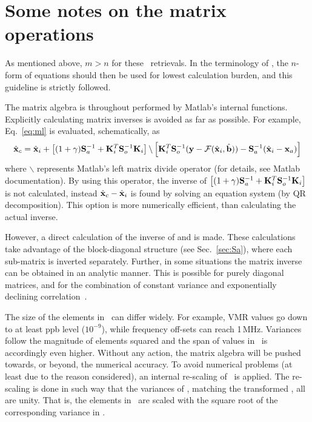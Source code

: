 \section{Some notes on the matrix operations}
\label{sec:matrixops}
%
As mentioned above, $m>n$ for these \smr\ retrievals. In the terminology of 
\citet{rodgers:00}, the $n$-form of equations should then be used for lowest
calculation burden, and this guideline is strictly followed.

The matrix algebra is throughout performed by Matlab's internal functions. Explicitly calculating matrix inverses is avoided as far as possible. For
example, Eq.~\ref{eq:ml} is evaluated, schematically, as
\begin{displaymath}
  \hat{\mathbf{x}}_c = \hat{\mathbf{x}}_i + 
  \left[ (1+\gamma)\mathbf{S}_{a}^{-1} + 
          \mathbf{K}_{i}^T\mathbf{S}_{o}^{-1}\mathbf{K}_{i} \right] \backslash
  \left[ \mathbf{K}_{i}^T\mathbf{S}_{o}^{-1}(\mathbf{y}-\mathcal{F}(\hat{\mathbf{x}}_i,\hat{\mathbf{b}})) -
         \mathbf{S}_{a}^{-1}(\hat{\mathbf{x}}_i-\mathbf{x}_{a})\right]  
\end{displaymath}
where $\backslash$ represents Matlab's left matrix divide operator (for
details, see Matlab documentation). By using this operator, the inverse
of $\left[ (1+\gamma)\mathbf{S}_{a}^{-1} +
  \mathbf{K}_{i}^T\mathbf{S}_{o}^{-1}\mathbf{K}_{i} \right]$ is not calculated, instead
$\hat{\mathbf{x}}_c - \hat{\mathbf{x}}_i$ is found by solving an equation system (by QR
decomposition). This option is more numerically efficient, than calculating the
actual inverse.

However, a direct calculation of the inverse of  and  is
made. These calculations take advantage of the block-diagonal structure (see
Sec.~\ref{sec:Sa}), where each sub-matrix is inverted separately. Further, in
some situations the matrix inverse can be obtained in an analytic manner. This
is possible for purely diagonal matrices, and for the combination of constant
variance and exponentially declining correlation\ \citep[][Sec.~10.3.2.2]{rodgers:00}.

The size of the elements in \SttVct\ can differ widely. For example, VMR values
go down to at least ppb level ($10^{-9}$), while frequency off-sets can reach
1\,MHz. Variances follow the magnitude of elements squared and the span of
values in \ is accordingly even higher. Without any action, the
matrix algebra will be pushed towards, or beyond, the numerical accuracy. To
avoid numerical problems (at least due to the reason considered), an internal
re-scaling of \SttVct\ is applied. The re-scaling is done in such way that the
variances of , matching the transformed \SttVct, all are unity. That
is, the elements in \SttVct\ are scaled with the square root of the
corresponding variance in .


